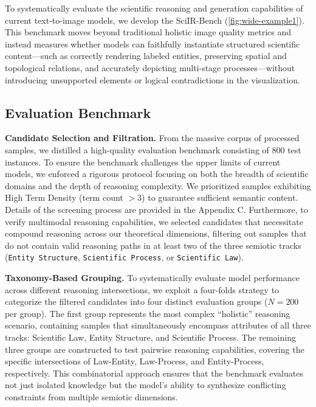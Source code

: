 \documentclass[runningheads]{llncs}
\begin{document}
To systematically evaluate the scientific reasoning and generation capabilities of current text-to-image models, we develop the SciIR-Bench (\cref{fig:wide-example1}). This benchmark moves beyond traditional holistic image quality metrics and instead measures whether models can faithfully instantiate structured scientific content—such as correctly rendering labeled entities, preserving spatial and topological relations, and accurately depicting multi-stage processes—without introducing unsupported elements or logical contradictions in the visualization.

\subsection{Evaluation Benchmark}

\textbf{Candidate Selection and Filtration.} From the massive corpus of processed samples, we distilled a high-quality evaluation benchmark consisting of 800 test instances. To ensure the benchmark challenges the upper limits of current models, we enforced a rigorous protocol focusing on both the breadth of scientific domains and the depth of reasoning complexity. We prioritized samples exhibiting High Term Density (term count $>3$) to guarantee sufficient semantic content. Details of the screening process are provided in the Appendix C. Furthermore, to verify multimodal reasoning capabilities, we selected candidates that necessitate compound reasoning across our theoretical dimensions, filtering out samples that do not contain valid reasoning paths in at least two of the three semiotic tracks (\texttt{Entity Structure}, \texttt{Scientific Process}, or \texttt{Scientific Law}).

\textbf{Taxonomy-Based Grouping.} To systematically evaluate model performance across different reasoning intersections, we exploit a four-folds strategy to categorize the filtered candidates into four distinct evaluation groups ($N=200$ per group). The first group represents the most complex ``holistic'' reasoning scenario, containing samples that simultaneously encompass attributes of all three tracks: Scientific Law, Entity Structure, and Scientific Process. The remaining three groups are constructed to test pairwise reasoning capabilities, covering the specific intersections of Law-Entity, Law-Process, and Entity-Process, respectively. This combinatorial approach ensures that the benchmark evaluates not just isolated knowledge but the model’s ability to synthesize conflicting constraints from multiple semiotic dimensions.
\end{document}
